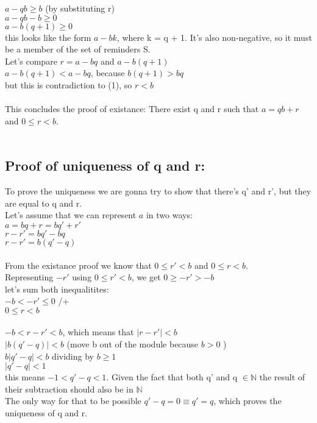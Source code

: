 \documentclass{article}
\begin{document}
$a - qb \geq b$ (by substituting r)\\
$a - qb - b \geq 0$\\
$a - b(q + 1) \geq 0$\\
this looks like the form $a - bk$, where k = q + 1. It's also non-negative, so it must be a member of the set of reminders S.\\
Let's compare $r = a - bq$ and $a - b(q + 1)$\\
$a - b(q + 1) < a - bq$, because $b(q + 1) > bq$\\
but this is contradiction to (1), so $r < b$\\
\\
This concludes the proof of existance: There exist q and r such that $a = qb + r$ and $0 \leq r < b$.
\\
\\
\subsection*{Proof of uniqueness of q and r:}
To prove the uniqueness we are gonna try to show that there's q' and r', but they are equal to q and r.\\
Let's assume that we can represent $a$ in two ways:\\
$a = bq + r = bq' + r'$\\
$r - r' = bq' - bq$\\
$r - r' = b(q' -q)$\\
\\
From the existance proof we know that $0 \leq r' < b$ and $0 \leq r < b$.\\
Representing $-r'$ using $0 \leq r' < b$, we get $0 \geq -r' > -b$\\
let's sum both inequalitites:\\
$-b < -r' \leq 0$ /+\\
$0 \leq r < b$\\
\\
$-b < r - r' < b$, which means that $|r - r'| < b$\\
$|b(q' - q)| < b$ (move b out of the module because $b > 0$ )\\
$b|q' - q| < b$ dividing by $b \geq 1$\\
$|q' - q| < 1$\\
this means $-1 < q' - q < 1$. Given the fact that both q' and q $\in \mathbb{N}$ the result of their subtraction should also be in $\mathbb{N}$\\
The only way for that to be possible $q' - q = 0 \equiv q' = q$, which proves the uniqueness of q and r.
\end{document}

